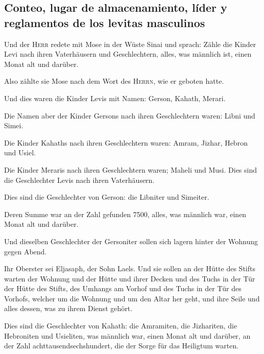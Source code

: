 \hypertarget{conteo-lugar-de-almacenamiento-luxedder-y-reglamentos-de-los-levitas-masculinos}{%
\subsection{Conteo, lugar de almacenamiento, líder y reglamentos de los
levitas
masculinos}\label{conteo-lugar-de-almacenamiento-luxedder-y-reglamentos-de-los-levitas-masculinos}}

 Und der \textsc{Herr} redete mit Mose in der Wüste Sinai
und sprach:  Zähle die Kinder Levi nach ihren
Vaterhäusern und Geschlechtern, alles, was männlich ist, einen Monat alt
und darüber.

 Also zählte sie Mose nach dem Wort des \textsc{Herrn},
wie er geboten hatte.

 Und dies waren die Kinder Levis mit Namen: Gerson,
Kahath, Merari.

 Die Namen aber der Kinder Gersons nach ihren
Geschlechtern waren: Libni und Simei.

 Die Kinder Kahaths nach ihren Geschlechtern waren:
Amram, Jizhar, Hebron und Usiel.

 Die Kinder Meraris nach ihren Geschlechtern waren;
Maheli und Musi. Dies sind die Geschlechter Levis nach ihren
Vaterhäusern.

 Dies sind die Geschlechter von Gerson: die Libniter und
Simeiter.

 Deren Summe war an der Zahl gefunden 7500, alles, was
männlich war, einen Monat alt und darüber.

 Und dieselben Geschlechter der Gersoniter sollen sich
lagern hinter der Wohnung gegen Abend.

 Ihr Oberster sei Eljasaph, der Sohn Laels.
 Und sie sollen an der Hütte des Stifts warten der
Wohnung und der Hütte und ihrer Decken und des Tuchs in der Tür der
Hütte des Stifts,  des Umhangs am Vorhof und des Tuchs in
der Tür des Vorhofs, welcher um die Wohnung und um den Altar her geht,
und ihre Seile und alles dessen, was zu ihrem Dienst gehört.

 Dies sind die Geschlechter von Kahath: die Amramiten,
die Jizhariten, die Hebroniten und Usieliten,  was
männlich war, einen Monat alt und darüber, an der Zahl
achttausendsechshundert, die der Sorge für das Heiligtum warten.

